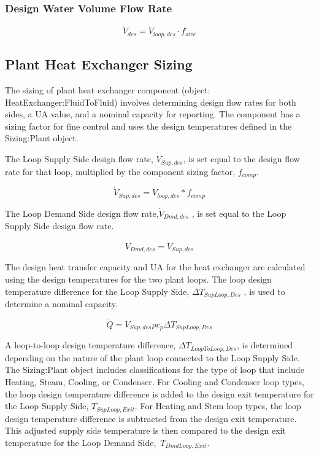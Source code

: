 \subsubsection{Design Water Volume Flow Rate}\label{design-boiler-water-flow-rate-1}

\begin{equation}
\dot{V}_{des} = \dot{V}_{loop,des} \cdot f_{size}
\end{equation}

\subsection{Plant Heat Exchanger Sizing}\label{plant-heat-exchanger-sizing}

The sizing of plant heat exchanger component (object: HeatExchanger:FluidToFluid) involves determining design flow rates for both sides, a UA value, and a nominal capacity for reporting. The component has a sizing factor for fine control and uses the design temperatures defined in the Sizing:Plant object.

The Loop Supply Side design flow rate, \({\dot V_{Sup,des}}\), is set equal to the design flow rate for that loop, multiplied by the component sizing factor, \({f_{comp}}\).

\begin{equation}
{\dot V_{Sup,des}} = {\dot V_{loop,des}}*{f_{comp}}
\end{equation}

The Loop Demand Side design flow rate,\({\dot V_{Dmd,des}}\) , is set equal to the Loop Supply Side design flow rate.

\begin{equation}
{\dot V_{Dmd,des}} = {\dot V_{Sup,des}}
\end{equation}

The design heat transfer capacity and UA for the heat exchanger are calculated using the design temperatures for the two plant loops. The loop design temperature difference for the Loop Supply Side, \(\Delta {T_{SupLoop,Des}}\) , is used to determine a nominal capacity.

\begin{equation}
\dot Q = V_{Sup,des} \rho {c_p} \Delta {T_{SupLoop,Des}}
\end{equation}

A loop-to-loop design temperature difference, \(\Delta {T_{LoopToLoop,Des}}\), is determined depending on the nature of the plant loop connected to the Loop Supply Side. The Sizing:Plant object includes classifications for the type of loop that include Heating, Steam, Cooling, or Condenser. For Cooling and Condenser loop types, the loop design temperature difference is added to the design exit temperature for the Loop Supply Side, \({T_{SupLoop,Exit}}\). For Heating and Stem loop types, the loop design temperature difference is subtracted from the design exit temperature. This adjusted supply side temperature is then compared to the design exit temperature for the Loop Demand Side,~\({T_{DmdLoop,Exit}}\).

